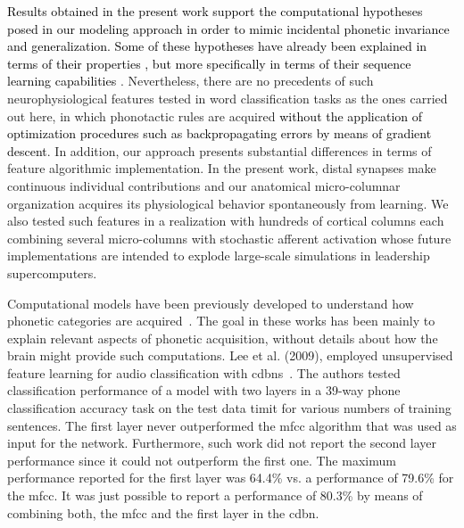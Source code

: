 \documentclass[10pt,letterpaper]{article}
\newcommand{\reviewerfour}[1]{\textcolor{black}{#1}}
\begin{document}
\reviewerfour{Results obtained in the present work support the computational hypotheses posed in our modeling approach in order to mimic incidental phonetic invariance and generalization.
Some of these hypotheses have already been explained in terms of their properties \cite{hawkins_2016}, but more specifically in terms of their sequence learning capabilities \cite{cui_2016}}.
Nevertheless, there are no precedents of such neurophysiological features tested in word classification tasks as the ones carried out here, in which phonotactic rules are acquired \reviewerfour{without the application of optimization procedures such as backpropagating errors by means of gradient descent}. In addition, our approach presents substantial differences in terms of feature algorithmic implementation. In the present work, distal synapses make continuous individual contributions and our anatomical micro-columnar organization acquires its physiological behavior spontaneously from learning. We also tested such features in a realization with hundreds of cortical columns each combining several micro-columns with stochastic afferent activation whose future implementations are intended to explode large-scale simulations in leadership supercomputers.%

Computational models have been previously developed to understand how phonetic categories are acquired~\cite{rasanen_2012}. The goal in these works has been mainly to explain relevant aspects of phonetic acquisition, without details about how the brain might provide such computations. 
Lee et al. (2009), employed unsupervised feature learning for audio classification with \glspl{cdbn}~\cite{Lee:2009:UFL:2984093.2984217}.
The authors tested classification performance of a model with two layers in a 39-way phone classification accuracy task on the test data \gls{timit} for various numbers of training sentences.
The first layer never outperformed the \gls{mfcc} algorithm that was used as input for the network.
Furthermore, such work did not report the second layer performance since it could not outperform the first one.
The maximum performance reported for the first layer was 64.4\% vs. a performance of 79.6\% for the \gls{mfcc}.
It was just possible to report a performance of 80.3\% by means of combining both, the \gls{mfcc} and the first layer in the \gls{cdbn}.
\end{document}
